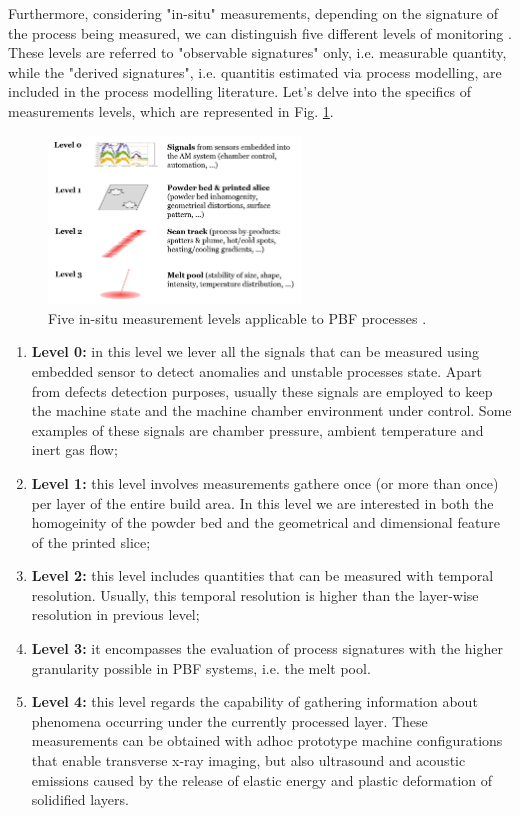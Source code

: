 Furthermore, considering "in-situ" measurements, depending on the signature of the process being measured, we can distinguish five different levels of monitoring \cite{grasso_-situ_2021, grasso_process_2017}. These levels are referred to "observable signatures" only, i.e. measurable quantity, while the "derived signatures", i.e. quantitis estimated via process modelling, are included in the process modelling literature.  Let's delve into the specifics of measurements levels, which are represented in Fig. \ref{fig:levels}.
\begin{figure}
    \centering
    \includegraphics[width=0.6\textwidth]{Images/Level Measurement.png}
    \caption[In-situ measurement levels.]{Five in-situ measurement levels applicable to PBF processes \cite{leach_-machine_2020}.}
    \label{fig:levels}
\end{figure}

\begin{enumerate}
    \item \textbf{Level 0:} in this level we lever all the signals that can be measured using embedded sensor to detect anomalies and unstable processes state. Apart from defects detection purposes, usually these signals are employed to keep the machine state and the machine chamber environment under control. Some examples of these signals are chamber pressure, ambient temperature and inert gas flow;
    \item \textbf{Level 1:} this level involves measurements gathere once (or more than once) per layer of the entire build area. In this level we are interested in both the homogeinity of the powder bed and the geometrical and dimensional feature of the printed slice;
    \item \textbf{Level 2:} this level includes quantities that can be measured with temporal resolution. Usually, this temporal resolution is higher than the layer-wise resolution in previous level;
    \item \textbf{Level 3:} it encompasses the evaluation of process signatures with the higher granularity possible in PBF systems, i.e. the melt pool. 
    \item \textbf{Level 4:} this level regards the capability of gathering information about phenomena occurring under the currently processed layer. These measurements can be obtained with adhoc prototype machine configurations that enable transverse x-ray imaging, but also ultrasound and acoustic emissions caused by the release of elastic energy and plastic deformation of solidified layers.
\end{enumerate}


